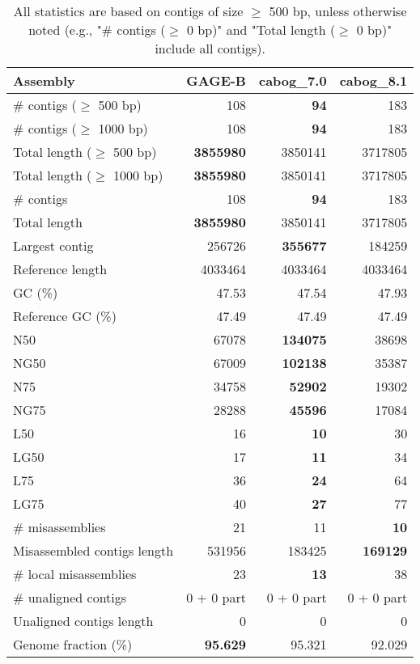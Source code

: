 \documentclass[12pt,a4paper]{article}
\begin{document}
\begin{table}[ht]
\begin{center}
\caption{All statistics are based on contigs of size $\geq$ 500 bp, unless otherwise noted (e.g., "\# contigs ($\geq$ 0 bp)" and "Total length ($\geq$ 0 bp)" include all contigs).}
\begin{tabular}{|l*{3}{|r}|}
\hline
Assembly & GAGE-B & cabog\_7.0 & cabog\_8.1 \\ \hline
\# contigs ($\geq$ 500 bp) & 108 & {\bf 94} & 183 \\ \hline
\# contigs ($\geq$ 1000 bp) & 108 & {\bf 94} & 183 \\ \hline
Total length ($\geq$ 500 bp) & {\bf 3855980} & 3850141 & 3717805 \\ \hline
Total length ($\geq$ 1000 bp) & {\bf 3855980} & 3850141 & 3717805 \\ \hline
\# contigs & 108 & {\bf 94} & 183 \\ \hline
Total length & {\bf 3855980} & 3850141 & 3717805 \\ \hline
Largest contig & 256726 & {\bf 355677} & 184259 \\ \hline
Reference length & 4033464 & 4033464 & 4033464 \\ \hline
GC (\%) & 47.53 & 47.54 & 47.93 \\ \hline
Reference GC (\%) & 47.49 & 47.49 & 47.49 \\ \hline
N50 & 67078 & {\bf 134075} & 38698 \\ \hline
NG50 & 67009 & {\bf 102138} & 35387 \\ \hline
N75 & 34758 & {\bf 52902} & 19302 \\ \hline
NG75 & 28288 & {\bf 45596} & 17084 \\ \hline
L50 & 16 & {\bf 10} & 30 \\ \hline
LG50 & 17 & {\bf 11} & 34 \\ \hline
L75 & 36 & {\bf 24} & 64 \\ \hline
LG75 & 40 & {\bf 27} & 77 \\ \hline
\# misassemblies & 21 & 11 & {\bf 10} \\ \hline
Misassembled contigs length & 531956 & 183425 & {\bf 169129} \\ \hline
\# local misassemblies & 23 & {\bf 13} & 38 \\ \hline
\# unaligned contigs & 0 + 0 part & 0 + 0 part & 0 + 0 part \\ \hline
Unaligned contigs length & 0 & 0 & 0 \\ \hline
Genome fraction (\%) & {\bf 95.629} & 95.321 & 92.029 \\ \hline

\end{tabular}
\end{center}
\end{table}
\end{document}

